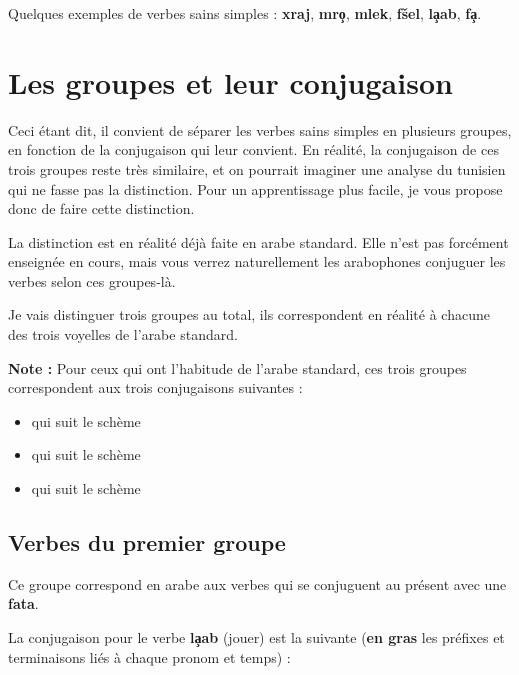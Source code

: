 Quelques exemples de verbes sains simples : \textbf{xraj}, \textbf{mro\c{\dh}}, \textbf{mlek}, \textbf{f\v{s}el}, \textbf{l\c{a}ab}, \textbf{\textcrh fa\c{\dh}}.


\section{Les groupes et leur conjugaison}\label{GroupesVerbesSimples}
Ceci étant dit, il convient de séparer les verbes sains simples en plusieurs groupes, en fonction de la conjugaison qui leur convient. En réalité, la conjugaison de ces trois groupes reste très similaire, et on pourrait imaginer une analyse du tunisien qui ne fasse pas la distinction. Pour un apprentissage plus facile, je vous propose donc de faire cette distinction.

La distinction est en réalité déjà faite en arabe standard. Elle n'est pas forcément enseignée en cours, mais vous verrez naturellement les arabophones conjuguer les verbes selon ces groupes-là.

Je vais distinguer trois groupes au total, ils correspondent en réalité à chacune des trois voyelles de l'arabe standard. 

\textbf{Note :} Pour ceux qui ont l'habitude de l'arabe standard, ces trois groupes correspondent aux trois conjugaisons suivantes : 
\begin{itemize}
    \item {} qui suit le schème 
    \item {} qui suit le schème 
    \item {} qui suit le schème 
\end{itemize}

\subsection{Verbes du premier groupe}
Ce groupe correspond en arabe aux verbes qui se conjuguent au présent avec une \textbf{fat\textcrh a}.

La conjugaison pour le verbe \textbf{l\c{a}ab} (jouer) est la suivante (\textbf{en gras} les préfixes et terminaisons liés à chaque pronom et temps) :

